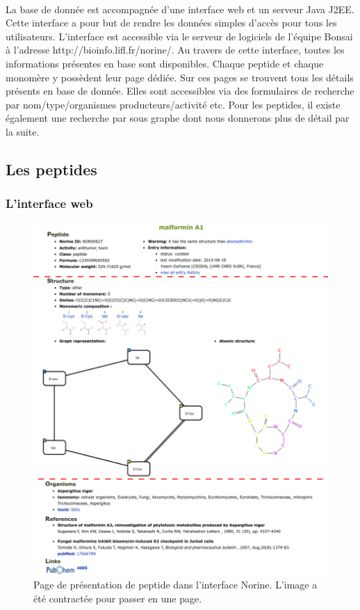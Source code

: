\documentclass[12pt,french,twoside]{report}
\begin{document}
\paragraph{}La base de donnée est accompagnée d'une interface web et un serveur Java J2EE.
Cette interface a pour but de rendre les données simples d'accès pour tous les utilisateurs.
L'interface est accessible via le serveur de logiciels de l'équipe Bonsai à l'adresse http://bioinfo.lifl.fr/norine/.
Au travers de cette interface, toutes les informations présentes en base sont disponibles.
Chaque peptide et chaque monomère y possèdent leur page dédiée.
Sur ces pages se trouvent tous les détails présents en base de donnée.
Elles sont accessibles via des formulaires de recherche par nom/type/organismes producteurs/activité etc.
Pour les peptides, il existe également une recherche par sous graphe dont nous donnerons plus de détail par la suite.



\subsection{Les peptides}

\subsubsection{L'interface web}

\begin{figure}[h!]
  \begin{center}
    \includegraphics[width=450px]{Figures/Norine/malformin_nor.png}
    \caption{\label{interface}Page de présentation de peptide dans l'interface Norine.
    L'image a été contractée pour passer en une page.}
  \end{center}
\end{figure}
\end{document}
